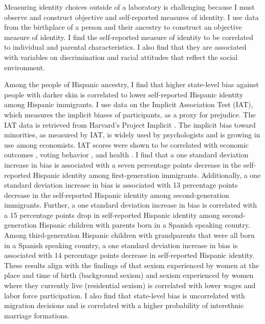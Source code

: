 \documentclass[12pt, fullpage]{article}
\begin{document}
Measuring identity choices outside of a laboratory is challenging because I must observe and construct objective and self-reported measures of identity. I use data from the birthplace of a person and their ancestry to construct an objective measure of identity. I find the self-reported measure of identity to be correlated to individual and parental characteristics. I also find that they are associated with variables on discrimination and racial attitudes that reflect the social environment. 

Among the people of Hispanic ancestry, I find that higher state-level bias against people with darker skin is correlated to lower self-reported Hispanic identity among Hispanic immigrants. I use data on the Implicit Association Test (IAT), which measures the implicit biases of participants, as a proxy for prejudice. The IAT data is retrieved from Harvard's Project Implicit \citep{greenwaldMeasuringIndividualDifferences1998}. The implicit bias toward minorities, as measured by IAT, is widely used by psychologists and is growing in use among economists. IAT scores were shown to be correlated with economic outcomes \citep{chettyRaceEconomicOpportunity2020,gloverDiscriminationSelfFulfillingProphecy2017}, voting behavior \citep{friesePredictingVotingBehavior2007}, and health \citep{leitnerRacialBiasAssociated2016}. I find that a one standard deviation increase in bias is associated with a seven percentage points decrease in the self-reported Hispanic identity among first-generation immigrants. Additionally,  a one standard deviation increase in bias is associated with 13 percentage points decrease in the self-reported Hispanic identity among second-generation immigrants. Further, a one standard deviation increase in bias is correlated with a 15 percentage points drop in self-reported Hispanic identity among second-generation Hispanic children with parents born in a Spanish speaking country. Among third-generation Hispanic children with grandparents that were all born in a Spanish speaking country, a one standard deviation increase in bias is associated with 14 percentage points decrease in self-reported Hispanic identity. These results align with the findings of \citet{charlesEffectsSexismAmerican2018} that sexism experienced by women at the place and time of birth (background sexism) and sexism experienced by women where they currently live (residential sexism) is correlated with lower wages and labor force participation. I also find that state-level bias is uncorrelated with migration decisions and is correlated with a higher probability of interethnic marriage formations.
\end{document}
